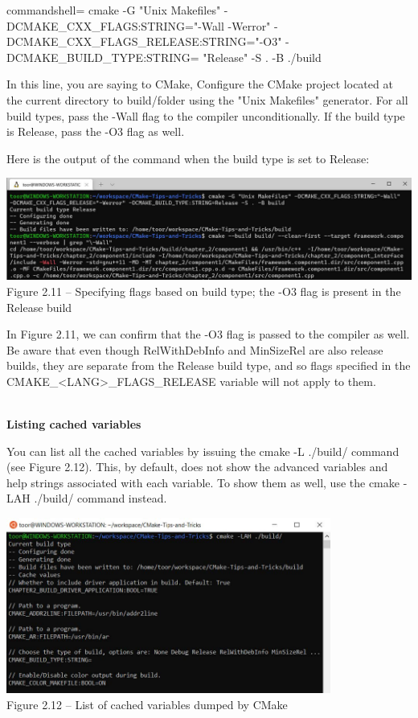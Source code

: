 \begin{tcblisting}{commandshell={}}
cmake -G "Unix Makefiles" -DCMAKE_CXX_FLAGS:STRING="-Wall
-Werror" -DCMAKE_CXX_FLAGS_RELEASE:STRING="-O3"
-DCMAKE_BUILD_TYPE:STRING= "Release" -S . -B ./build
\end{tcblisting}

In this line, you are saying to CMake, Configure the CMake project located at the current directory to build/folder using the "Unix Makefiles" generator. For all build types, pass the -Wall flag to the compiler unconditionally. If the build type is Release, pass the -O3 flag as well.

Here is the output of the command when the build type is set to Release:

\begin{center}
\includegraphics[width=1.\textwidth]{content/1/chapter2/images/11.jpg}\\
Figure 2.11 – Specifying flags based on build type; the -O3 flag is present in the Release build
\end{center}

In Figure 2.11, we can confirm that the -O3 flag is passed to the compiler as well. Be aware that even though RelWithDebInfo and MinSizeRel are also release builds, they are separate from the Release build type, and so flags specified in the CMAKE\_<LANG>\_FLAGS\_RELEASE variable will not apply to them.

\hspace*{\fill} \\ %
\noindent
\textbf{Listing cached variables}

You can list all the cached variables by issuing the cmake -L ./build/ command (see Figure 2.12). This, by default, does not show the advanced variables and help strings associated with each variable. To show them as well, use the cmake -LAH ./build/ command instead.

\begin{center}
\includegraphics[width=0.8\textwidth]{content/1/chapter2/images/12.jpg}\\
Figure 2.12 – List of cached variables dumped by CMake
\end{center}

